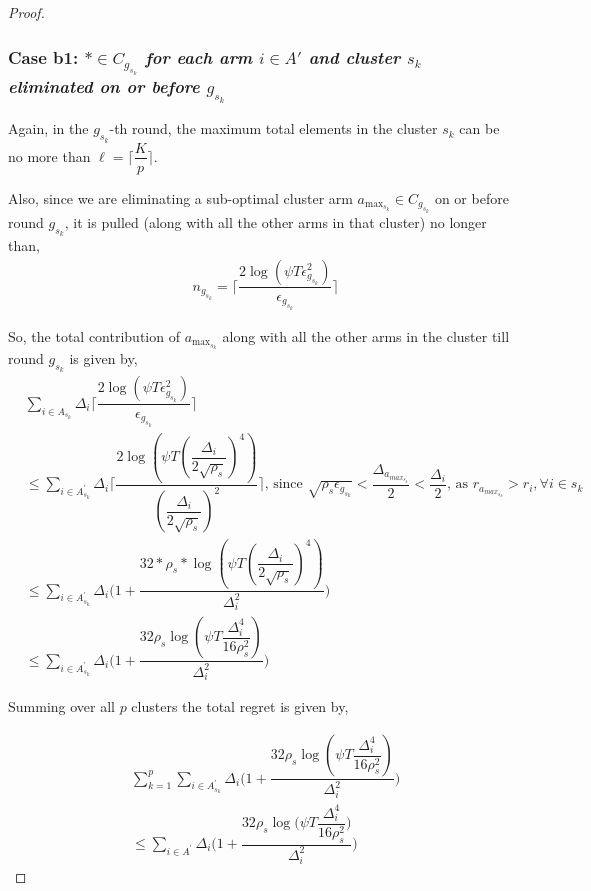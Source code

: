 \begin{proof}
\subsubsection*{Case b1: \textit{${*}\in C_{g_{s_{k}}}$ for each arm $i \in A'$ and cluster $s_{k}$ eliminated on or before $g_{s_{k}}$} }
	
	Again, in the $g_{s_{k}}$-th round, the maximum total elements in the cluster $s_{k}$ can be no more than $\ell=\bigg\lceil \dfrac{K}{p}\bigg\rceil$.
 
Also, since we are eliminating a sub-optimal cluster arm $a_{\max_{s_{k}}}\in C_{g_{s_{k}}}$ on or before round $g_{s_{k}}$, it is pulled (along with all the other arms in that cluster) no longer than,
 \begin{align*}
 &n_{g_{s_{k}}}=\bigg\lceil\dfrac{2\log{(\psi T\epsilon_{g_{s_{k}}}^{2})}}{\epsilon_{g_{s_{k}}}}\bigg\rceil
 \end{align*}

So, the total contribution of $a_{\max_{s_{k}}}$  along with all the other arms in the cluster till round $g_{s_{k}}$ is given by,
 \begin{align*}
 &\sum_{i\in A_{s_{k}}}\Delta_{i}\bigg\lceil\dfrac{2\log{(\psi T\epsilon_{g_{s_{k}}}^{2})}}{\epsilon_{g_{s_{k}}}}\bigg\rceil\\
 &\leq\sum_{i\in A_{s_{k}}^{'}}\Delta_{i}\bigg\lceil\dfrac{2\log{(\psi T(\dfrac{\Delta_{i}}{2\sqrt{\rho_{s}}})^{4})}}{(\dfrac{\Delta_{i}}{2\sqrt{\rho_{s}}})^{2}}\bigg\rceil \text{, since }\sqrt{\rho_{s}\epsilon_{g_{s_{k}}}} <\dfrac{\Delta_{a_{max_{s_{k}}}}}{2} <  \dfrac{\Delta_{i}}{2} \text{, as } {r}_{a_{max_{s_{k}}}}>{r}_{i},\forall i\in s_{k}\\
 &\leq\sum_{i\in A_{s_{k}}^{'}}\Delta_{i}\bigg(1+\dfrac{32*\rho_{s}*\log{(\psi T(\dfrac{\Delta_{i}}{2\sqrt{\rho_{s}}})^{4})}}{\Delta_{i}^{2}}\bigg)\\
 &\leq\sum_{i\in A_{s_{k}}^{'}}\Delta_{i}\bigg(1+\dfrac{32\rho_{s}\log{(\psi T\dfrac{\Delta_{i}^{4}}{16\rho_{s}^{2}})}}{\Delta_{i}^{2}}\bigg)
 \end{align*}

 
Summing over all $p$ clusters the total regret is given by,
 
\begin{align*}
&\sum_{k=1}^{p}\sum_{i\in A_{s_{k}}^{'}}\Delta_{i}\bigg(1+\dfrac{32\rho_{s}\log{(\psi  T\dfrac{\Delta_{i}^{4}}{16\rho_{s}^{2}})}}{\Delta_{i}^{2}}\bigg)\\
&\leq\sum_{i\in A^{'}}\Delta_{i}\bigg(1+\dfrac{32\rho_{s}\log{(\psi T\dfrac{\Delta_{i}^{4}}{16\rho_{s}^{2}}})}{\Delta_{i}^{2}}\bigg)
\end{align*}



\end{proof}

